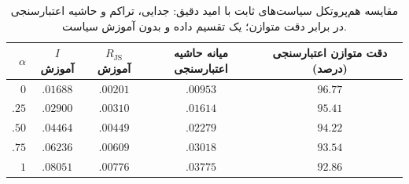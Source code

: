 \begin{table}[htbp]
\centering\small
\caption{مقایسه هم‌پروتکل سیاست‌های ثابت با امید دقیق:
جدایی، تراکم و حاشیه اعتبارسنجی در برابر دقت متوازن؛
یک تقسیم داده و بدون آموزش سیاست.}
\label{tab:ch4-fixed-guided-exact}
\begin{tabular}{rcccc}\hline
$\alpha$ & $I$ آموزش & $R_{\mathrm{JS}}$ آموزش &
میانه حاشیه اعتبارسنجی & دقت متوازن اعتبارسنجی (درصد)\\\hline
$0$ & $.01688$ & $.00201$ & $.00953$ & $96.77$\\
$.25$ & $.02900$ & $.00310$ & $.01614$ & $95.41$\\
$.50$ & $.04464$ & $.00449$ & $.02279$ & $94.22$\\
$.75$ & $.06236$ & $.00609$ & $.03018$ & $93.54$\\
$1$ & $.08051$ & $.00776$ & $.03775$ & $92.86$\\\hline
\end{tabular}
\end{table}

